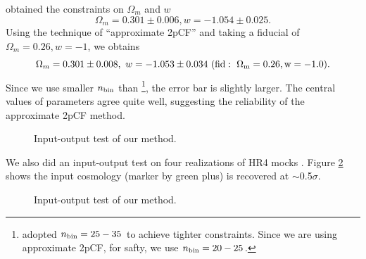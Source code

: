 \documentclass[useAMS,usenatbib]{mnras}
\begin{document}
\citep{Li2016} obtained the constraints on $\Omega_m$ and $w$
\begin{equation}\label{eq:wcdm_constrain_default}
 \Omega_m=0.301\pm 0.006, w=−1.054\pm 0.025.
\end{equation}
Using the technique of ``approximate 2pCF'' and taking a fiducial of $\Omega_m=0.26, w=-1$, we obtains
\begin{equation}
\Omega_m = 0.301 \pm 0.008,\ w=-1.053\pm 0.034\ (\rm fid:\ \Omega_m=0.26, w=-1.0).
\end{equation}
Since we use smaller $n_{\rm bin}$ than \citep{Li2016}
\footnote{\citep{Li2016} adopted $n_{\rm bin}=25-35$ to achieve tighter constraints.
Since we are using approximate 2pCF, for safty, we use $n_{\rm bin}=20-25$.}, the error bar is slightly larger.
The central values of parameters agree quite well, suggesting the reliability of the approximate 2pCF method.

\begin{figure}
   \caption{\label{fig_IO}
   Input-output test of our method.
   }
\end{figure}

We also did an input-output test on four realizations of HR4 mocks \cite{hr4}.
Figure \ref{fig_IO} shows the input cosmology (marker by green plus) is recovered at $\sim$0.5$\sigma$.

\begin{figure}
   \caption{\label{fig_IO}
   Input-output test of our method.
   }
\end{figure}
\end{document}
